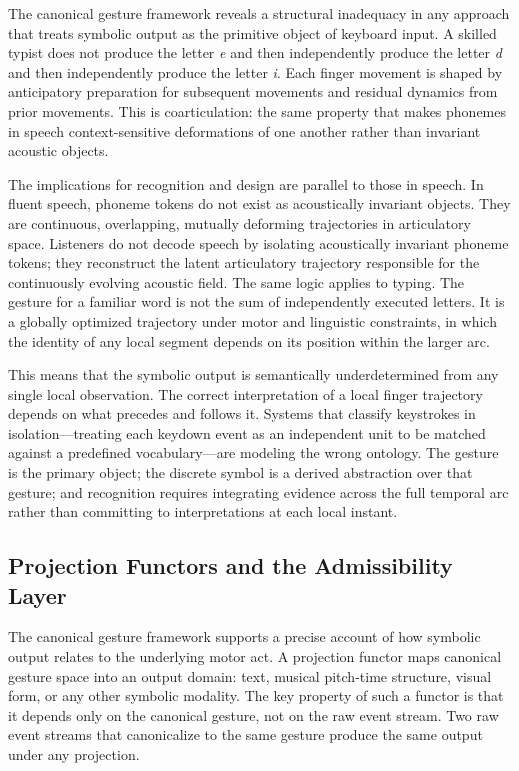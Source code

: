 \documentclass[12pt,a4paper]{article}
\theoremstyle{plain}
\theoremstyle{definition}
\theoremstyle{remark}
\begin{document}
The canonical gesture framework reveals a structural inadequacy in any approach
that treats symbolic output as the primitive object of keyboard input. A
skilled typist does not produce the letter \textit{e} and then independently
produce the letter \textit{d} and then independently produce the letter
\textit{i}. Each finger movement is shaped by anticipatory preparation for
subsequent movements and residual dynamics from prior movements. This is
coarticulation: the same property that makes phonemes in speech context-sensitive
deformations of one another rather than invariant acoustic objects.

The implications for recognition and design are parallel to those in speech.
In fluent speech, phoneme tokens do not exist as acoustically invariant objects.
They are continuous, overlapping, mutually deforming trajectories in articulatory
space. Listeners do not decode speech by isolating acoustically invariant
phoneme tokens; they reconstruct the latent articulatory trajectory responsible
for the continuously evolving acoustic field. The same logic applies to typing.
The gesture for a familiar word is not the sum of independently executed letters.
It is a globally optimized trajectory under motor and linguistic constraints,
in which the identity of any local segment depends on its position within the
larger arc.

This means that the symbolic output is semantically underdetermined from any
single local observation. The correct interpretation of a local finger
trajectory depends on what precedes and follows it. Systems that classify
keystrokes in isolation---treating each keydown event as an independent unit
to be matched against a predefined vocabulary---are modeling the wrong
ontology. The gesture is the primary object; the discrete symbol is a derived
abstraction over that gesture; and recognition requires integrating evidence
across the full temporal arc rather than committing to interpretations at
each local instant.

\subsection{Projection Functors and the Admissibility Layer}

The canonical gesture framework supports a precise account of how symbolic
output relates to the underlying motor act. A projection functor maps canonical
gesture space into an output domain: text, musical pitch-time structure, visual
form, or any other symbolic modality. The key property of such a functor is
that it depends only on the canonical gesture, not on the raw event stream. Two
raw event streams that canonicalize to the same gesture produce the same output
under any projection.
\end{document}
